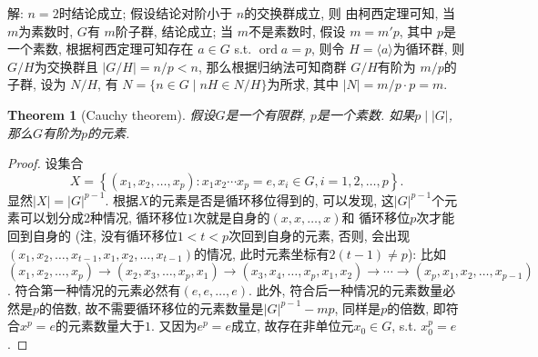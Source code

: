 \documentclass[a4paper,12pt]{ctexart}
\newtheorem{theorem}{Theorem}
\newtheorem{proof}{Proof}
\begin{document}
  解: $ n=2 $时结论成立; 
  假设结论对阶小于 $ n $的交换群成立, 则
  由柯西定理可知, 当 $ m $为素数时, $ G $有 $ m $阶子群, 结论成立;
  当 $ m $不是素数时, 假设 $ m=m'p $, 其中 $ p $是一个素数, 根据柯西定理可知存在 $ a\in G $ s.t. $ \operatorname{ord} a=p $, 
  则令 $ H=\langle a\rangle $为循环群, 则 $ G/H $为交换群且 $ |G/H|=n/p<n $, 
  那么根据归纳法可知商群 $ G/H $有阶为 $ m/p $的子群, 设为 $ N/H $, 有 $ N=\{n\in G\mid nH\in N/H\} $为所求, 其中 $ |N|=m/p\cdot p=m $.

  \begin{theorem}[Cauchy theorem]
    假设$G$是一个有限群, $p$是一个素数. 如果$p\mid|G|$, 那么$G$有阶为$p$的元素.
  \end{theorem}
  \begin{proof}
    设集合
    \[X=\left\{ (x_1,x_2,\dots,x_p):x_1x_2\cdots x_p=e, x_i\in G, i=1,2,\dots,p \right\}.\] 
    显然$|X|=|G|^{p-1}$. 
    根据$X$的元素是否是循环移位得到的, 可以发现, 这$|G|^{p-1}$个元素可以划分成$2$种情况, 循环移位$1$次就是自身的$(x,x,\dots,x)$和
    循环移位$p$次才能回到自身的 (注, 没有循环移位$1<t<p$次回到自身的元素, 否则, 会出现$(x_1,x_2,\dots,x_{t-1},x_1,x_2,\dots,x_{t-1})$的情况, 此时元素坐标有$2(t-1)\ne p$): 比如$(x_1,x_2,\dots,x_p)\rightarrow(x_2,x_3,\dots,x_p,x_1)\rightarrow(x_3,x_4,\dots,x_p,x_1,x_2)\rightarrow\cdots\rightarrow(x_p,x_1,x_2,\dots,x_{p-1})$.
    符合第一种情况的元素必然有$(e,e,\dots,e)$.  
    此外, 符合后一种情况的元素数量必然是$p$的倍数, 故不需要循环移位的元素数量是$|G|^{p-1}-mp$, 同样是$p$的倍数, 
    即符合$x^p=e$的元素数量大于$1$. 
    又因为$e^p=e$成立, 故存在非单位元$x_0\in G$, s.t. $x_0^p=e$. 
  \end{proof}
\end{document}
